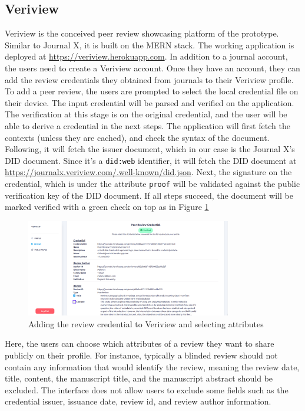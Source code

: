 \subsection{Veriview}

Veriview is the conceived peer review showcasing platform of the prototype. Similar to Journal X, it is built on the \acrshort{MERN} stack. The working application is deployed at \url{https://veriview.herokuapp.com}. In addition to a journal account, the users need to create a Veriview account. Once they have an account, they can add the review credentials they obtained from journals to their Veriview profile. To add a peer review, the users are prompted to select the local credential file on their device. The input credential will be parsed and verified on the application. The verification at this stage is on the original credential, and the user will be able to derive a credential in the next steps. The application will first fetch the contexts (unless they are cached), and check the syntax of the document. Following, it will fetch the issuer document, which in our case is the Journal X's \acrshort{DID} document. Since it's a \lstinline{did:web} identifier, it will fetch the \acrshort{DID} document at \url{https://journalx.veriview.com/.well-known/did.json}. Next, the signature on the credential, which is under the attribute \lstinline{proof} will be validated against the public verification key of the \acrshort{DID} document. If all steps succeed, the document will be marked verified with a green check on top as in Figure \ref{fig:select-attributes}

\begin{figure}[htpb]
  \centering
  \includegraphics[width=0.8\textwidth]{figures/select-attributes.png}
  \caption{Adding the review credential to Veriview and selecting attributes} \label{fig:select-attributes}
\end{figure}

Here, the users can choose which attributes of a review they want to share publicly on their profile. For instance, typically a blinded review should not contain any information that would identify the review, meaning the review date, title, content, the manuscript title, and the manuscript abstract should be excluded. The interface does not allow users to exclude some fields such as the credential issuer, issuance date, review id, and review author information.

